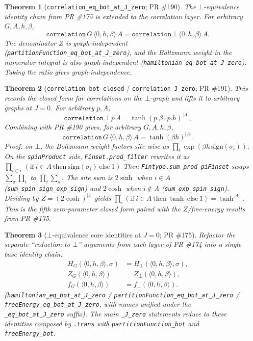 \documentclass[a4paper,11pt]{article}
\newtheorem{theorem}{Theorem}
\begin{document}
\begin{theorem}[\texttt{correlation\_eq\_bot\_at\_J\_zero}; PR \#190]
The $\bot$-equivalence identity chain from PR \#175 is extended to the
correlation layer. For arbitrary $G, A, h, \beta$,
\[
  \texttt{correlation}\,G\,\langle 0, h, \beta\rangle\,A
    = \texttt{correlation}\,\bot\,\langle 0, h, \beta\rangle\,A.
\]
The denominator $Z$ is graph-independent
(\texttt{partitionFunction\_eq\_bot\_at\_J\_zero}),
and the Boltzmann weight in the numerator integral is also graph-independent
(\texttt{hamiltonian\_eq\_bot\_at\_J\_zero}).
Taking the ratio gives graph-independence.
\end{theorem}

\begin{theorem}[\texttt{correlation\_bot\_closed} / \texttt{correlation\_J\_zero}; PR \#191]
This records the closed form for correlations on the $\bot$-graph and lifts
it to arbitrary graphs at $J=0$. For arbitrary $p, A$,
\[
  \texttt{correlation}\,\bot\,p\,A = \tanh(p.\beta \cdot p.h)^{|A|},
\]
Combining with PR \#190 gives, for arbitrary $G, A, h, \beta$,
\[
  \texttt{correlation}\,G\,\langle 0, h, \beta\rangle\,A
    = \tanh(\beta h)^{|A|}.
\]
Proof: on $\bot$, the Boltzmann weight factors site-wise as
$\prod_i \exp(\beta h\,\mathrm{sign}(\sigma_i))$. On the
\texttt{spinProduct} side, \texttt{Finset.prod\_filter} rewrites it as
$\prod_{i \in \iota}\, (\mathrm{if}\ i \in A\ \mathrm{then}\ \mathrm{sign}(\sigma_i)\ \mathrm{else}\ 1)$
Then \texttt{Fintype.sum\_prod\_piFinset} swaps
$\sum_\sigma \prod_i$ to $\prod_i \sum_s$. The site sum is $2\sinh$ when
$i \in A$ (\texttt{sum\_spin\_sign\_exp\_sign}) and $2\cosh$ when
$i \notin A$ (\texttt{sum\_exp\_spin\_sign}). Dividing by
$Z = (2\cosh)^{|\iota|}$ yields
$\prod_i (\mathrm{if}\ i \in A\ \mathrm{then}\ \tanh\ \mathrm{else}\ 1) = \tanh^{|A|}$.
This is the fifth zero-parameter closed form paired with the $Z$/free-energy
results from PR \#175.
\end{theorem}

\begin{theorem}[$\bot$-equivalence core identities at $J=0$; PR \#175]
Refactor the separate ``reduction to $\bot$'' arguments from each layer of
PR \#174 into a single base identity chain:
\begin{align*}
  H_G(\langle 0, h, \beta\rangle, \sigma) &= H_\bot(\langle 0, h, \beta\rangle, \sigma), \\
  Z_G(\langle 0, h, \beta\rangle) &= Z_\bot(\langle 0, h, \beta\rangle), \\
  f_G(\langle 0, h, \beta\rangle) &= f_\bot(\langle 0, h, \beta\rangle).
\end{align*}
(\texttt{hamiltonian\_eq\_bot\_at\_J\_zero} /
\texttt{partitionFunction\_eq\_bot\_at\_J\_zero} /
\texttt{freeEnergy\_eq\_bot\_at\_J\_zero}, with names unified under the
\texttt{\_eq\_bot\_at\_J\_zero} suffix). The main \texttt{\_J\_zero}
statements reduce to these identities composed by \texttt{.trans} with
\texttt{partitionFunction\_bot} and \texttt{freeEnergy\_bot}.
\end{theorem}
\end{document}
